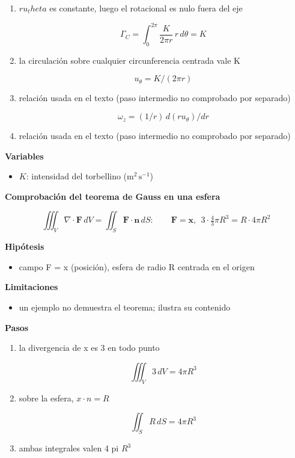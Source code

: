 \documentclass[10pt,openany]{book}
\begin{document}
\begin{tcolorbox}[title={Desarrollos del modelo}, studiumdef, breakable]
\begin{enumerate}
\[
\omega_z = \frac{1}{r}\frac{d}{dr}\left(\frac{K}{2\pi}\right) = 0
\]
\item
\(r u_theta\) es constante, luego el rotacional es nulo fuera del eje

\[
\Gamma_C = \int_0^{2\pi}\frac{K}{2\pi r}\,r\,d\theta = K
\]
\item
la circulación sobre cualquier circunferencia centrada vale K

\[
u_\theta = K/(2\pi r)
\]
\item
relación usada en el texto (paso intermedio no comprobado por separado)

\[
\omega_z = (1/r)\,d(r u_\theta)/dr
\]
\item
relación usada en el texto (paso intermedio no comprobado por separado)
\end{enumerate}

\noindent\textbf{Variables}
\begin{itemize}
\item $K$: intensidad del torbellino ($\mathrm{m}^{2}\,\mathrm{s}^{-1}$)
\end{itemize}



\noindent\textbf{Comprobación del teorema de Gauss en una esfera}

\[
\iiint_V \nabla\cdot\mathbf{F}\,dV = \iint_S \mathbf{F}\cdot\mathbf{n}\,dS:\qquad \mathbf{F} = \mathbf{x},\ \ 3\cdot\tfrac43\pi R^{3} = R\cdot 4\pi R^{2}
\]

\noindent\textbf{Hipótesis}
\begin{itemize}
\item campo F = x (posición), esfera de radio R centrada en el origen
\end{itemize}

\noindent\textbf{Limitaciones}
\begin{itemize}
\item un ejemplo no demuestra el teorema; ilustra su contenido
\end{itemize}

\noindent\textbf{Pasos}
\begin{enumerate}
\item
la divergencia de x es 3 en todo punto

\[
\iiint_V 3\,dV = 4\pi R^{3}
\]
\item
sobre la esfera, \(x \cdot n = R\)

\[
\iint_S R\,dS = 4\pi R^{3}
\]
\item
ambas integrales valen 4 pi \(R^3\)
\end{enumerate}


\end{tcolorbox}
\end{document}
